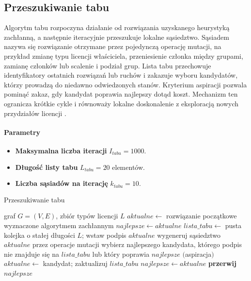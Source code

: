 \subsection{Przeszukiwanie tabu}\label{subsec:tabu}
Algorytm tabu rozpoczyna działanie od rozwiązania uzyskanego heurystyką zachłanną, a następnie iteracyjnie przeszukuje lokalne sąsiedztwo. Sąsiadem nazywa się rozwiązanie otrzymane przez pojedynczą operację mutacji, na przykład zmianę typu licencji właściciela, przeniesienie członka między grupami, zamianę członków lub scalenie i podział grup. Lista tabu przechowuje identyfikatory ostatnich rozwiązań lub ruchów i zakazuje wyboru kandydatów, którzy prowadzą do niedawno odwiedzonych stanów. Kryterium aspiracji pozwala pominąć zakaz, gdy kandydat poprawia najlepszy dotąd koszt. Mechanizm ten ogranicza krótkie cykle i równoważy lokalne doskonalenie z eksploracją nowych przydziałów licencji \cite{glover1989}.

\paragraph{Parametry}
\begin{itemize}
  \item \textbf{Maksymalna liczba iteracji} $I_{tabu}=1000$.
  \item \textbf{Długość listy tabu} $L_{tabu}=20$ elementów.
  \item \textbf{Liczba sąsiadów na iterację} $k_{tabu}=10$.
\end{itemize}

\begin{algorithm}[H]
  \caption{Przeszukiwanie tabu}\label{alg:tabu}
  \begin{algorithmic}[1]
    \Require graf \(G=(V,E)\), zbiór typów licencji \(L\)
    \State \(aktualne \gets\) rozwiązanie początkowe wyznaczone algorytmem zachłannym
    \State \(najlepsze \gets aktualne\)
    \State \(lista\_tabu \gets\) pusta kolejka o stałej długości \(L\); wstaw podpis \(aktualne\)
    \State wygeneruj sąsiedztwo \(aktualne\) przez operacje mutacji
    \State wybierz najlepszego kandydata, którego podpis nie znajduje się na \(lista\_tabu\) lub który poprawia \(najlepsze\) \((\)aspiracja\()\)
    \State \(aktualne \gets\) kandydat; zaktualizuj \(lista\_tabu\)
     \State \(najlepsze \gets aktualne\) \EndIf
    \Else
    \State \textbf{przerwij}
    \EndIf
    \EndFor
    \State \Return \(najlepsze\)
  \end{algorithmic}
\end{algorithm}

